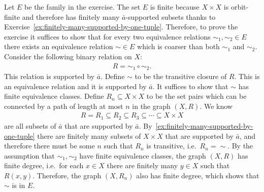  {Let $E$ be the family in the exercise. The set $E$ is finite because $X\times X$ is orbit-finite and therefore has finitely many $\bar a$-supported subsets thanks to Exercise~\ref{ex:finitely-many-supported-by-one-tuple}. Therefore, to prove the exercise it suffices to show that for every two equivalence relations $\sim_1,\sim_2 \in E$ there exists an equivalence relation $\sim \in E$ which is coarser than both $\sim_1$ and $\sim_2$. Consider the following binary relation on $X$:
\begin{align*}
 R = \sim_1 \circ \sim_2.
\end{align*}
This relation is supported by $\bar a$. Define $\sim$ to be the transitive closure of $R$. This is an equivalence relation and it is supported by $\bar a$. It suffices to show that $\sim$ has finite equivalence classes. Define $R_n \subseteq X \times X$ to be the set pairs which can be connected by a path of length at most $n$ in the graph $(X,R)$. We know 
\begin{align*}
 R = R_1 \subseteq R_2 \subseteq R_3 \subseteq \cdots \subseteq X \times X
\end{align*}
are all subsets of $\bar a$ that are supported by $\bar a$. By~\ref{ex:finitely-many-supported-by-one-tuple} there are finitely many subsets of $X \times X$ that are supported by $\bar a$, and therefore there must be some $n$ such that $R_n$ is transitive, i.e.~$R_n = \sim$. By the assumption that $\sim_1,\sim_2$ have finite equivalence classes, the graph $(X,R)$ has finite degree, i.e.~for each $x \in X$ there are finitely many $y \in X$ such that $R(x,y)$. Therefore, the graph $(X,R_n)$ also has finite degree, which shows that $\sim$ is in $E$.
 }

